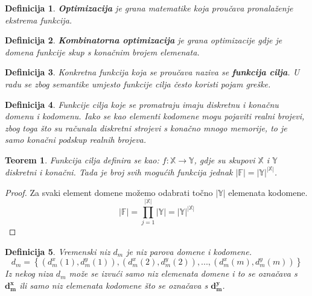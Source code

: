 \documentclass[times, utf8, diplomski, numeric]{fer}
\newtheorem{definition}{Definicija}
\newtheorem{theorem}{Teorem}
\begin{document}
\begin{definition}
\textbf{Optimizacija} je grana matematike koja proučava pronalaženje ekstrema funkcija.
\end{definition}

\begin{definition}
\textbf{Kombinatorna optimizacija} je grana optimizacije gdje je domena funkcije skup s konačnim brojem elemenata.
\end{definition}

\begin{definition}
Konkretna funkcija koja se proučava naziva se \textbf{funkcija cilja}.
U radu se zbog semantike umjesto funkcije cilja često koristi pojam greške.
\end{definition}

\begin{definition}
Funkcije cilja koje se promatraju imaju diskretnu i konačnu domenu i kodomenu. Iako se kao elementi kodomene mogu pojaviti realni brojevi, zbog toga što su računala diskretni strojevi s konačno mnogo memorije, to je samo konačni podskup realnih brojeva.
\end{definition}

\begin{theorem}
Funkcija cilja definira se kao: $f : \mathbb{X} \rightarrow \mathbb{Y}$, gdje su skupovi $\mathbb{X}$ i $\mathbb{Y}$ diskretni i konačni. Tada je broj svih mogućih funkcija jednak $|\mathbb{F}| = |\mathbb{Y}|^{|\mathbb{X}|}$. 
\end{theorem}

\begin{proof}
Za svaki element domene možemo odabrati točno $|\mathbb{Y}|$ elemenata kodomene. 
\begin{equation}
|\mathbb{F}| = \prod_{j=1}^{|\mathbb{X}|} |\mathbb{Y}| =  |\mathbb{Y}|^{|\mathbb{X}|}
\end{equation}
\end{proof}

\begin{definition}
Vremenski niz $d_m$ je niz parova domene i kodomene.
\begin{equation}
d_m = \left \{ (d_m^x(1), d_m^y(1)), (d_m^x(2), d_m^y(2)), ..., (d_m^x(m), d_m^y(m))\right \}
\end{equation} 
Iz nekog niza $d_m$ može se izvući samo niz elemenata domene i to se označava s $\mathbf{d_m^x}$ ili samo niz elemenata kodomene što se označava s $\mathbf{d_m^y}$.
\end{definition}
\end{document}

